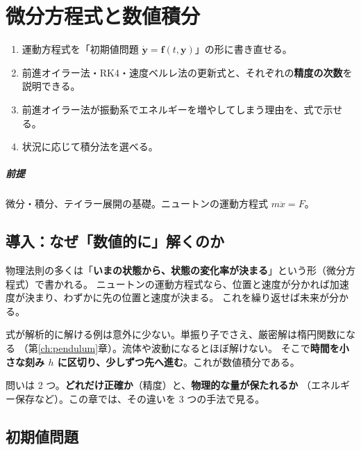 \chapter{微分方程式と数値積分}\label{ch:ode}

\begin{objectives}
\begin{enumerate}
  \item 運動方程式を「初期値問題 $\dot{\mathbf y}=\mathbf f(t,\mathbf y)$」の形に書き直せる。
  \item 前進オイラー法・RK4・速度ベルレ法の更新式と、それぞれの\textbf{精度の次数}を説明できる。
  \item 前進オイラー法が振動系でエネルギーを増やしてしまう理由を、式で示せる。
  \item 状況に応じて積分法を選べる。
\end{enumerate}
\end{objectives}

\paragraph{前提}
微分・積分、テイラー展開の基礎。ニュートンの運動方程式 $m\ddot x=F$。

\section{導入：なぜ「数値的に」解くのか}\label{sec:ode-intro}

物理法則の多くは「\textbf{いまの状態から、状態の変化率が決まる}」という形（微分方程式）で書かれる。
ニュートンの運動方程式なら、位置と速度が分かれば加速度が決まり、わずかに先の位置と速度が決まる。
これを繰り返せば未来が分かる。

式が解析的に解ける例は意外に少ない。単振り子でさえ、厳密解は楕円関数になる
（第\ref{ch:pendulum}章）。流体や波動になるとほぼ解けない。
そこで\textbf{時間を小さな刻み $h$ に区切り、少しずつ先へ進む}。これが数値積分である。

問いは 2 つ。\textbf{どれだけ正確か}（精度）と、\textbf{物理的な量が保たれるか}
（エネルギー保存など）。この章では、その違いを 3 つの手法で見る。

\section{初期値問題}\label{sec:ivp}

